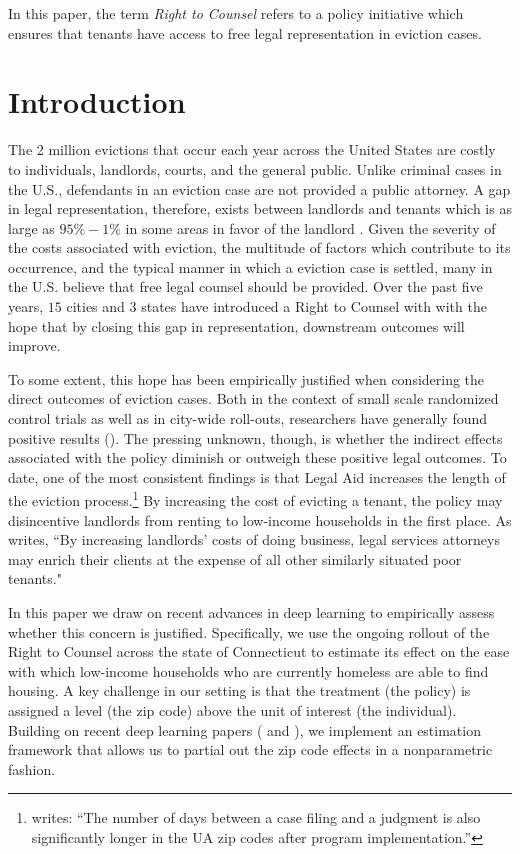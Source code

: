 \documentclass[a4paper,12pt]{article}
\begin{document}


In this paper, the term \textit{Right to Counsel} refers to a policy initiative which ensures that tenants have access to free legal representation in eviction cases. 

\section{Introduction}
The 2 million evictions that occur each year across the United States are costly to individuals, landlords, courts, and the general public. Unlike criminal cases in the U.S., defendants in an eviction case are not provided a public attorney. A gap in legal representation, therefore, exists between landlords and tenants which is as large as $95\%-1\%$ in some areas in favor of the landlord  \cite{collinson2022eviction}. Given the severity of the costs associated with eviction, the multitude of factors which contribute to its occurrence, and the typical manner in which a eviction case is settled, many in the U.S. believe that free legal counsel should be provided.  Over the past five years, $15$ cities and $3$ states have introduced a Right to Counsel with with the hope that by closing this gap in representation, downstream outcomes will improve. \par 

To some extent, this hope has been empirically justified when considering the direct outcomes of eviction cases. Both in the context of small scale randomized control trials as well as in city-wide roll-outs, researchers have generally found positive results (\cite{seron2001impact, greiner2012limits, cassidy2022effects}). The pressing unknown, though, is whether the indirect effects associated with the policy diminish or outweigh these positive legal outcomes. To date, one of the most consistent findings is that Legal Aid increases the length of the eviction process.\footnote{\cite{cassidy2022effects} writes: ``The number of days between a case filing and a judgment is also significantly longer in the UA zip codes after program implementation.''} By increasing the cost of evicting a tenant, the policy may disincentive landlords from renting to low-income households in the first place. As \cite{gunn1995eviction} writes, ``By increasing landlords' costs of doing business, legal services attorneys may enrich their clients at the expense of all other similarly situated poor tenants." \par 
In this paper we draw on recent advances in deep learning to empirically assess whether this concern is justified. Specifically, we use the ongoing rollout of the Right to Counsel across the state of Connecticut to estimate its effect on the ease with which low-income households who are currently homeless are able to find housing. A key challenge in our setting is that the treatment (the policy) is assigned a level (the zip code) above the unit of interest (the individual). Building on recent deep learning papers (\cite{finn2017model} and \cite{kelly2020learning}), we implement an estimation framework that allows us to partial out the zip code effects in a nonparametric fashion.
\end{document}
